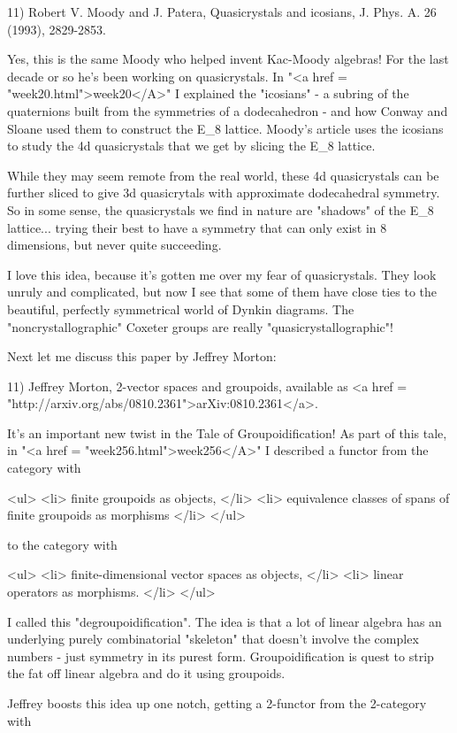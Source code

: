 11) Robert V. Moody and J. Patera, Quasicrystals and icosians, 
J. Phys. A. 26 (1993), 2829-2853. 

Yes, this is the same Moody who helped invent Kac-Moody algebras!  For
the last decade or so he's been working on quasicrystals.  In "<a
href = "week20.html">week20</A>" I explained the
"icosians" - a subring of the quaternions built from the
symmetries of a dodecahedron - and how Conway and Sloane used them to
construct the E_{8} lattice.  Moody's article uses the
icosians to study the 4d quasicrystals that we get by slicing the
E_{8} lattice.

While they may seem remote from the real world, these 4d quasicrystals
can be further sliced to give 3d quasicrytals with approximate
dodecahedral symmetry.  So in some sense, the quasicrystals we find
in nature are "shadows" of the E_{8}
lattice... trying their best to have a symmetry that can only exist in
8 dimensions, but never quite succeeding.

I love this idea, because it's gotten me over my fear of
quasicrystals.  They look unruly and complicated, but now I see that
some of them have close ties to the beautiful, perfectly symmetrical
world of Dynkin diagrams.  The "noncrystallographic" Coxeter
groups are really "quasicrystallographic"!

Next let me discuss this paper by Jeffrey Morton:

11) Jeffrey Morton, 2-vector spaces and groupoids, available as 
<a href = "http://arxiv.org/abs/0810.2361">arXiv:0810.2361</a>.

It's an important new twist in the Tale of Groupoidification!  As
part of this tale, in "<a href = "week256.html">week256</A>"
I described a functor from the category with

<ul>
<li>
finite groupoids as objects, 
</li>
<li>
equivalence classes of spans of finite groupoids as morphisms
</li>
</ul>

to the category with

<ul>
<li>
finite-dimensional vector spaces as objects,
</li>
<li>
linear operators as morphisms.
</li>
</ul>

I called this "degroupoidification".  The idea is that a lot
of linear algebra has an underlying purely combinatorial
"skeleton" that doesn't involve the complex numbers - just
symmetry in its purest form.  Groupoidification is quest to strip the
fat off linear algebra and do it using groupoids.

Jeffrey boosts this idea up one notch, getting a 2-functor from
the 2-category with

